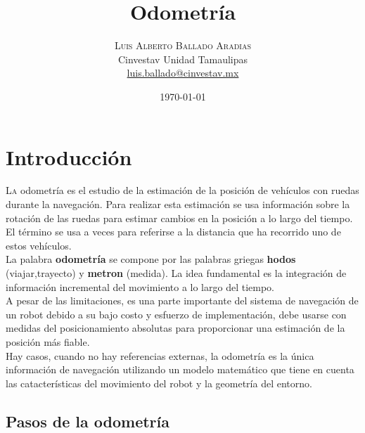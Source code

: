\documentclass[oneside,twocolumn]{article}
\title{Odometría} %
\author{%
\textsc{Luis Alberto Ballado Aradias} \\%
\normalsize Cinvestav Unidad Tamaulipas \\ %
\normalsize \href{mailto:luis.ballado@cinvestav.mx}{luis.ballado@cinvestav.mx} %
}
\date{\today} %
\begin{document}
\maketitle


\section{Introducción}

\lettrine[nindent=0em,lines=3]{L}a odometría es el estudio de la estimación de la posición de vehículos con ruedas durante la navegación. Para realizar esta estimación se usa información sobre la rotación de las ruedas para estimar cambios en la posición a lo largo del tiempo. El término se usa a veces para referirse a la distancia que ha recorrido uno de estos vehículos.\\

La palabra \textbf{odometría} se compone por las palabras griegas \textbf{hodos} (viajar,trayecto) y \textbf{metron} (medida). La idea fundamental es la integración de información incremental del movimiento a lo largo del tiempo.\\

A pesar de las limitaciones, es una parte importante del sistema de navegación de un robot debido a su bajo costo y esfuerzo de implementación, debe usarse con medidas del posicionamiento absolutas para proporcionar una estimación de la posición más fiable.\\

Hay casos, cuando no hay referencias externas, la odometría es la única información de navegación utilizando un modelo matemático que tiene en cuenta las catacterísticas del movimiento del robot y la geometría del entorno. %


\subsection{Pasos de la odometría}
\end{document}
